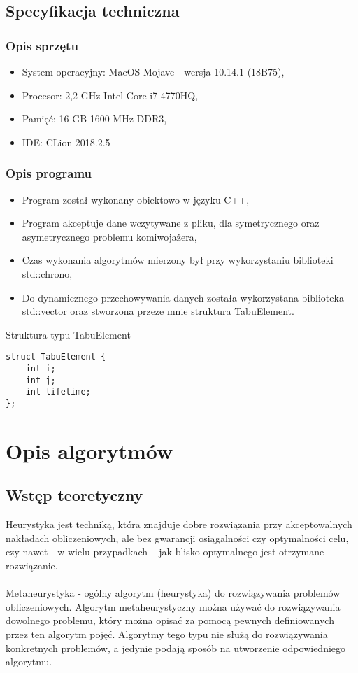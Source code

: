 \documentclass[12pt,a4paper,titlepage]{article}
\begin{document}
\subsection{Specyfikacja techniczna}
\subsubsection{Opis sprzętu}
\begin{itemize}
    \item System operacyjny: MacOS Mojave - wersja 10.14.1 (18B75),
    \item Procesor: 2,2 GHz Intel Core i7-4770HQ,
    \item Pamięć: 16 GB 1600 MHz DDR3,
    \item IDE: CLion 2018.2.5
\end{itemize}
\subsubsection{Opis programu}
\begin{itemize}
    \item Program został wykonany obiektowo w języku C++,
    \item Program akceptuje dane wczytywane z pliku, dla symetrycznego oraz asymetrycznego problemu komiwojażera,
    \item Czas wykonania algorytmów mierzony był przy wykorzystaniu biblioteki std::chrono,
    \item Do dynamicznego przechowywania danych została wykorzystana biblioteka std::vector oraz stworzona przeze mnie struktura TabuElement.
\end{itemize}

\begin{listing}[H]
\caption{Struktura typu TabuElement}
\begin{verbatim}
struct TabuElement {
    int i;
    int j;
    int lifetime;
};
\end{verbatim}
\end{listing}

\section{Opis algorytmów}
\subsection{Wstęp teoretyczny}
Heurystyka jest techniką, która znajduje dobre rozwiązania przy akceptowalnych nakładach obliczeniowych, ale bez gwarancji osiągalności czy optymalności celu, czy nawet - w  wielu przypadkach – jak blisko optymalnego jest otrzymane rozwiązanie.\cite{agh}
\\\\
Metaheurystyka - ogólny algorytm (heurystyka) do rozwiązywania problemów obliczeniowych. Algorytm metaheurystyczny można używać do rozwiązywania dowolnego problemu, który można opisać za pomocą pewnych definiowanych przez ten algorytm pojęć. Algorytmy tego typu nie służą do rozwiązywania konkretnych problemów, a jedynie podają sposób na utworzenie odpowiedniego algorytmu.\cite{agh}
\end{document}
